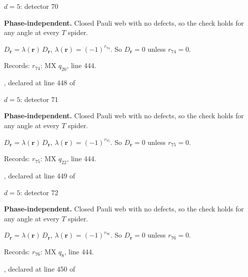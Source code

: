 \label{d5_det070}
{\Large $d=5$: detector 70}\par
\textbf{Phase-independent.} Closed Pauli web with no defects, so the check holds for any angle at every $T$ spider.
\begin{center}
\end{center}
\vspace{-1mm}
$D_{\boldsymbol r}=\lambda(\boldsymbol r)\,D_{\boldsymbol r}$, \quad $\lambda(\boldsymbol r)=(-1)^{r_{74}}$. \qquad So $D_{\boldsymbol r}=0$ unless $r_{74}=0$.
\par\smallskip\begin{minipage}{.98\linewidth}\small Records: $r_{74}$: MX $q_{20}$, line 444.\end{minipage}
\vfill
{\footnotesize\texttt{}, declared at line 448 of \texttt{}}
\newpage

\label{d5_det071}
{\Large $d=5$: detector 71}\par
\textbf{Phase-independent.} Closed Pauli web with no defects, so the check holds for any angle at every $T$ spider.
\begin{center}
\end{center}
\vspace{-1mm}
$D_{\boldsymbol r}=\lambda(\boldsymbol r)\,D_{\boldsymbol r}$, \quad $\lambda(\boldsymbol r)=(-1)^{r_{75}}$. \qquad So $D_{\boldsymbol r}=0$ unless $r_{75}=0$.
\par\smallskip\begin{minipage}{.98\linewidth}\small Records: $r_{75}$: MX $q_{22}$, line 444.\end{minipage}
\vfill
{\footnotesize\texttt{}, declared at line 449 of \texttt{}}
\newpage

\label{d5_det072}
{\Large $d=5$: detector 72}\par
\textbf{Phase-independent.} Closed Pauli web with no defects, so the check holds for any angle at every $T$ spider.
\begin{center}
\end{center}
\vspace{-1mm}
$D_{\boldsymbol r}=\lambda(\boldsymbol r)\,D_{\boldsymbol r}$, \quad $\lambda(\boldsymbol r)=(-1)^{r_{76}}$. \qquad So $D_{\boldsymbol r}=0$ unless $r_{76}=0$.
\par\smallskip\begin{minipage}{.98\linewidth}\small Records: $r_{76}$: MX $q_{8}$, line 444.\end{minipage}
\vfill
{\footnotesize\texttt{}, declared at line 450 of \texttt{}}
\newpage

